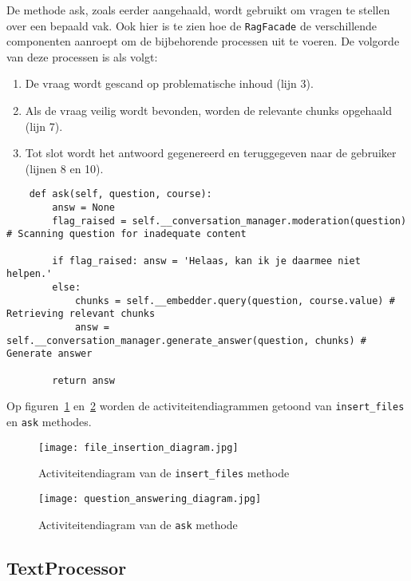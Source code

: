 De methode ask, zoals eerder aangehaald, wordt gebruikt om vragen te stellen over een bepaald vak. Ook hier is te zien hoe de \texttt{RagFacade} de verschillende componenten aanroept om de bijbehorende processen uit te voeren. De volgorde van deze processen is als volgt:

\begin{enumerate}
    \item De vraag wordt gescand op problematische inhoud (lijn 3).
    \item Als de vraag veilig wordt bevonden, worden de relevante chunks opgehaald (lijn 7).
    \item Tot slot wordt het antwoord gegenereerd en teruggegeven naar de gebruiker (lijnen 8 en 10).
\end{enumerate} 

\begin{verbatim}
    def ask(self, question, course):
        answ = None 
        flag_raised = self.__conversation_manager.moderation(question) # Scanning question for inadequate content

        if flag_raised: answ = 'Helaas, kan ik je daarmee niet helpen.'
        else:
            chunks = self.__embedder.query(question, course.value) # Retrieving relevant chunks
            answ = self.__conversation_manager.generate_answer(question, chunks) # Generate answer

        return answ
\end{verbatim}

Op figuren~\ref{fig:insert-flow} en~\ref{fig:ask-flow} worden de activiteitendiagrammen getoond van \texttt{insert\_files} en \texttt{ask} methodes.

\begin{figure}
    \centering
    \texttt{[image: file\_insertion\_diagram.jpg]}
    \caption[Flow van insert\_files methode]{\label{fig:insert-flow}Activiteitendiagram van de \texttt{insert\_files} methode}
\end{figure}

\begin{figure}
    \centering
    \texttt{[image: question\_answering\_diagram.jpg]}
    \caption[Flow van ask methode]{\label{fig:ask-flow}Activiteitendiagram van de \texttt{ask} methode}
\end{figure}

\subsection{TextProcessor}%
\label{subsec:TextProcessor}

